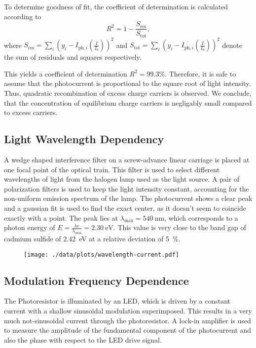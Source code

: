 To determine goodness of fit, the coefficient of determination is calculated according to
\begin{equation*}
	R^2 = 1 - \frac{S_\text{res}}{S_\text{tot}},
\end{equation*}
where $S_\text{res}=\sum_i\left(y_i - I_{\text{ph},i}\left(\frac{I}{I_0}\right)\right)^2$ and $S_\text{tot}=\sum_i\left(y_i - \overline{I_{\text{ph},i}}\left(\frac{I}{I_0}\right)\right)^2$ denote the sum of residuals and squares respectively.

This yields a coefficient of determination $R^2 = 99.3\%$.
Therefore, it is safe to assume that the photocurrent is proportional to the square root of light intensity.
Thus, quadratic recombination of excess charge carriers is observed.
We conclude, that the concentration of equilibrium charge carriers is negligably small compared to excess carriers.

\subsection{Light Wavelength Dependency}
A wedge shaped interference filter on a screw-advance linear carriage is placed at one focal point of the optical train.
This filter is used to select different wavelengths of light from the halogen lamp used as the light source.
A pair of polarization filters is used to keep the light intensity constant, accounting for the non-uniform emission spectrum of the lamp.
The photocurrent shows a clear peak and a gaussian fit is used to find the exact center, as it doesn't seem to coincide exactly with a point.
The peak lies at $\lambda_\text{max} = \SI{540}{\nano\meter}$, which corresponds to a photon energy of $E = \frac{h c}{\lambda_\text{max}} = \SI{2.30}{\electronvolt}$.
This value is very close to the band gap of cadmium sulfide of \SI{2.42}{\electronvolt} at a relative deviation of \SI{5}{\percent}.
\begin{figure}
	\centering
	\texttt{[image: ./data/plots/wavelength-current.pdf]}
	\label{fig:freq-current}
\end{figure}

\subsection{Modulation Frequency Dependence}
The Photoresistor is illuminated by an LED, which is driven by a constant current with a shallow sinusoidal modulation superimposed.
This results in a very much not-sinusoidal current through the photoresistor.
A lock-in amplifier is used to measure the amplitude of the fundamental component of the photocurrent and also the phase with respect to the LED drive signal.

